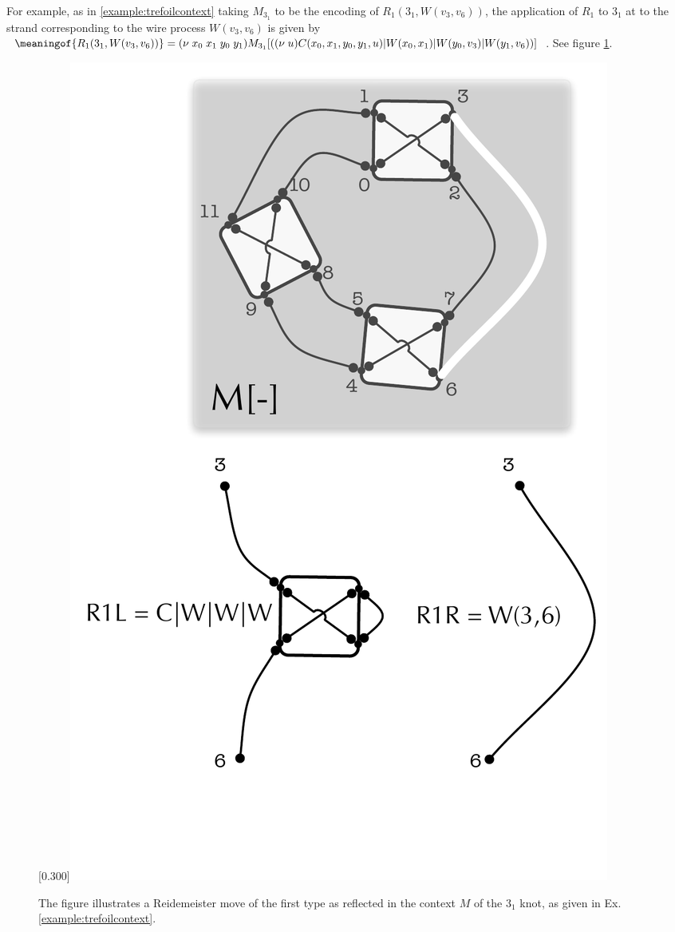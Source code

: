 \begin{example} For example,  as in
  \ref{example:trefoilcontext} taking $M_{3_1}$ to be  the encoding of $R_1(3_1,W(v_3,v_6))$,
  the application of $R_1$ to $3_1$ at to the strand corresponding to
  the wire process $W(v_3,v_6)$ is given by
  $\meaningof{R_1(3_1,W(v_3,v_6))} = (\nu \; x_{0} \; x_{1} \; y_{0}
  \; y_{1})M_{3_1}[((\nu \; u)C(x_{0},x_{1},y_{0},y_{1},u) |
  W(x_{0},x_{1}) | W(y_{0},v_{3}) | W(y_{1},v_{6}))]$. See figure
  \ref{fig:TrefoilContextIllustration}.
  
  \begin{figure}[tbp]
    \centering
    \scalebox{0.30}[0.300]{\includegraphics[viewport=30 30 810 550]{../../illustrations/TrefoilContextIllustration}}
    \caption{The figure illustrates a Reidemeister move of the first type as reflected in the context $M$ of the $3_1$  knot, as given in Ex. \ref{example:trefoilcontext}. }
  \label{fig:TrefoilContextIllustration}
\end{figure}
\end{example}

